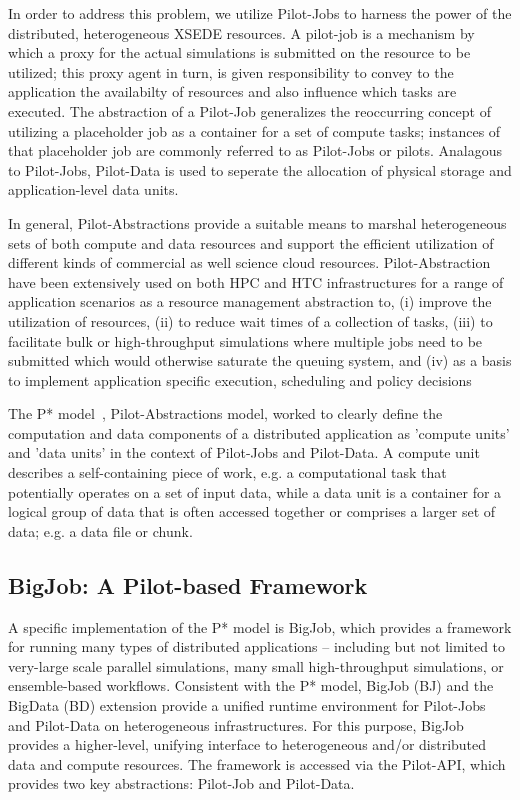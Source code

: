 \documentclass{sig-alternate}
\begin{document}
In order to address this problem, we utilize Pilot-Jobs
to harness the power of the distributed, heterogeneous XSEDE
resources. A pilot-job is a mechanism by
which a proxy for the actual simulations is submitted on the
resource to be utilized; this proxy agent in turn, is given
responsibility to convey to the application the availabilty of
resources and also influence which tasks are executed. The
abstraction of a Pilot-Job generalizes the reoccurring concept
of utilizing a placeholder job as a container for a set of
compute tasks; instances of that placeholder job are commonly referred 
to as Pilot-Jobs or pilots. Analagous to Pilot-Jobs, Pilot-Data is used to seperate the allocation of physical storage and application-level data units. 

In general, Pilot-Abstractions provide a suitable means to marshal heterogeneous sets of both compute and data resources and support the efficient utilization of different kinds of commercial as well science cloud resources. Pilot-Abstraction have been extensively used on both HPC and HTC infrastructures for a range of application scenarios as a resource management abstraction to, (i) improve the utilization of resources, (ii) to reduce wait times of a collection of tasks, (iii) to facilitate bulk or high-throughput simulations where multiple jobs need to be submitted which would otherwise saturate the queuing system, and (iv) as a basis to implement application specific execution, scheduling and policy decisions

The P* model~\cite{pstar}, Pilot-Abstractions model, worked to clearly define the computation and data components of a distributed application as 'compute units' and 'data units' in the context of Pilot-Jobs and Pilot-Data. A compute unit describes a self-containing piece of work, e.g. a computational task that potentially operates on a set of input data, while a data unit is a container for a logical group of data that is often accessed together or comprises a larger set of data; e.g. a data file or chunk.


\subsection{BigJob: A Pilot-based Framework}

A specific implementation of the P* model is BigJob, which provides a framework for running many types of distributed applications -- including but not limited to very-large scale parallel simulations, many small high-throughput simulations, or ensemble-based workflows. Consistent with the P* model, BigJob (BJ) and the BigData (BD) extension provide a unified runtime environment for Pilot-Jobs and Pilot-Data on heterogeneous infrastructures. For this purpose, BigJob provides a higher-level, unifying interface to heterogeneous and/or distributed data and compute resources. The framework is accessed via the Pilot-API, which provides two key abstractions: Pilot-Job and Pilot-Data.
\end{document}
